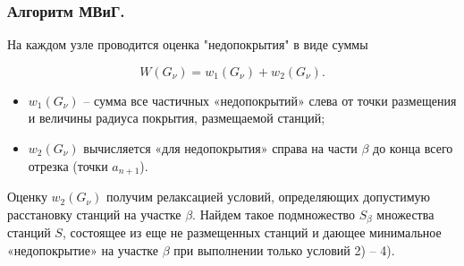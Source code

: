     


\begin{frame}
    \frametitle{Алгоритм МВиГ.}
    \justifying
    На каждом узле проводится оценка "недопокрытия"  в виде суммы

    \begin{displaymath}
        W\left(G_\nu\right) = w_1\left(G_\nu \right) + w_2\left(G_\nu \right). 
    \end{displaymath}

    \begin{itemize}
        \item $w_1 \left(G_\nu \right)$ -- сумма все частичных «недопокрытий» слева от точки размещения и величины радиуса покрытия, размещаемой станций;
        \item $w_2 \left(G_\nu \right)$ вычисляется «для недопокрытия» справа на части $\beta$ до конца всего отрезка (точки $a_{n+1}$).
    \end{itemize}
    Оценку $w_2 \left(G_\nu \right)$ получим релаксацией условий, определяющих допустимую расстановку станций на участке $\beta$. Найдем такое подмножество $S_\beta$ множества станций $S$, состоящее из еще не размещенных станций и дающее минимальное «недопокрытие» на участке $\beta$ при выполнении только условий 2) – 4). 
    
\end{frame}

